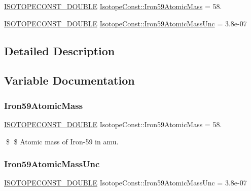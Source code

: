 \begin{DoxyCompactItemize}
\item 
\mbox{\hyperlink{group___isotope_const-_macros_ga8f45a7272ce02c0b4c65c44636ed719a}{I\+S\+O\+T\+O\+P\+E\+C\+O\+N\+S\+T\+\_\+\+D\+O\+U\+B\+LE}} \mbox{\hyperlink{group___isotope_const-_iron-_fe59_gaaaca6798f479958e98013d1de62bea09}{Isotope\+Const\+::\+Iron59\+Atomic\+Mass}} = 58.
\item 
\mbox{\hyperlink{group___isotope_const-_macros_ga8f45a7272ce02c0b4c65c44636ed719a}{I\+S\+O\+T\+O\+P\+E\+C\+O\+N\+S\+T\+\_\+\+D\+O\+U\+B\+LE}} \mbox{\hyperlink{group___isotope_const-_iron-_fe59_gad518b7c646727eaea6165d15d6a11162}{Isotope\+Const\+::\+Iron59\+Atomic\+Mass\+Unc}} = 3.\+8e-\/07
\end{DoxyCompactItemize}


\subsection{Detailed Description}


\subsection{Variable Documentation}
\mbox{\label{group___isotope_const-_iron-_fe59_gaaaca6798f479958e98013d1de62bea09}} 
\subsubsection{\texorpdfstring{Iron59\+Atomic\+Mass}{Iron59AtomicMass}}
{\footnotesize\ttfamily \mbox{\hyperlink{group___isotope_const-_macros_ga8f45a7272ce02c0b4c65c44636ed719a}{I\+S\+O\+T\+O\+P\+E\+C\+O\+N\+S\+T\+\_\+\+D\+O\+U\+B\+LE}} Isotope\+Const\+::\+Iron59\+Atomic\+Mass = 58.}

\$ \$ Atomic mass of Iron-\/59 in amu. \mbox{\label{group___isotope_const-_iron-_fe59_gad518b7c646727eaea6165d15d6a11162}} 
\subsubsection{\texorpdfstring{Iron59\+Atomic\+Mass\+Unc}{Iron59AtomicMassUnc}}
{\footnotesize\ttfamily \mbox{\hyperlink{group___isotope_const-_macros_ga8f45a7272ce02c0b4c65c44636ed719a}{I\+S\+O\+T\+O\+P\+E\+C\+O\+N\+S\+T\+\_\+\+D\+O\+U\+B\+LE}} Isotope\+Const\+::\+Iron59\+Atomic\+Mass\+Unc = 3.\+8e-\/07}

